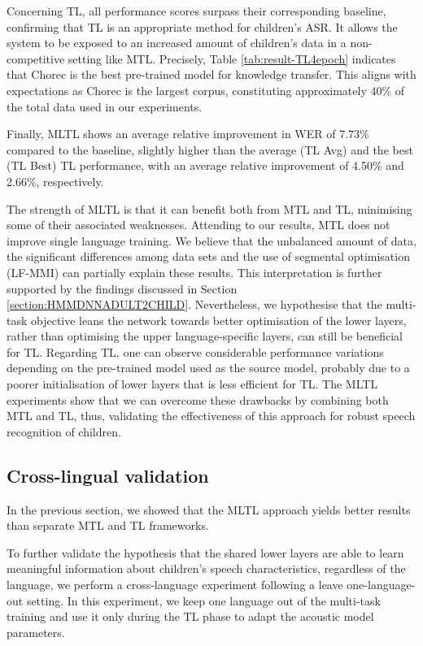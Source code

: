 Concerning \ac{TL}, all performance scores surpass their corresponding baseline, confirming that \ac{TL} is an appropriate method for children's \ac{ASR}. It allows the system to be exposed to an increased amount of children's data in a non-competitive setting like \ac{MTL}. Precisely, Table \ref{tab:result-TL4epoch} indicates that Chorec is the best pre-trained model for knowledge transfer. This aligns with expectations as Chorec is the largest corpus, constituting approximately 40\% of the total data used in our experiments.


Finally, \ac{MLTL} shows an average relative improvement in \ac{WER} of 7.73\%  compared to the baseline, slightly higher than the average (\ac{TL} Avg) and the best (\ac{TL} Best) \ac{TL} performance, with an average relative improvement of 4.50\% and 2.66\%, respectively. 

The strength of \ac{MLTL} is that it can benefit both from \ac{MTL} and \ac{TL}, minimising some of their associated weaknesses.
Attending to our results, \ac{MTL} does not improve single language training. We believe that the unbalanced amount of data, the significant differences among data sets and the use of segmental optimisation (\ac{LF-MMI}) can partially explain these results. This interpretation is further supported by the findings discussed in Section \ref{section:HMMDNNADULT2CHILD}. Nevertheless, we hypothesise that the multi-task objective leans the network towards 
better optimisation of the lower layers, rather than optimising the upper language-specific layers, can still be beneficial for \ac{TL}.
Regarding \ac{TL}, one can observe considerable performance variations depending on the pre-trained model used as the source model, probably due to a poorer initialisation of lower layers that is less efficient for \ac{TL}. The \ac{MLTL} experiments show that we can overcome these drawbacks by combining both \ac{MTL} and \ac{TL}, thus, validating the effectiveness of this approach for robust speech recognition of children.


\subsection{Cross-lingual validation}
\label{section:olo}

In the previous section, we showed that the \ac{MLTL} approach yields better results than separate \ac{MTL} and \ac{TL} frameworks.

To further validate the hypothesis that the shared lower layers are able to learn meaningful information about children's speech characteristics, regardless of the language, we perform a cross-language experiment following a leave one-language-out setting. In this experiment, we keep one language out of the multi-task training and use it only during the \ac{TL} phase to adapt the acoustic model parameters. 


